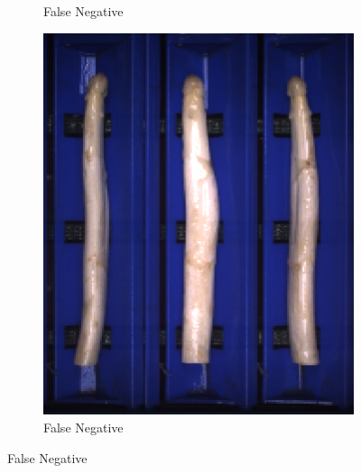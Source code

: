 \begin{figure}[h]
\begin{subfigure}{0.3\textwidth}
		\vspace{-5pt}
		\caption{False Negative}
	\end{subfigure}
	\begin{subfigure}{0.3\textwidth}
		\includegraphics[width=0.9\linewidth]{Figures/appendix/thick_falsenegative_03.png}
		\vspace{-5pt}
		\caption{False Negative}
	\end{subfigure}


\end{figure}
